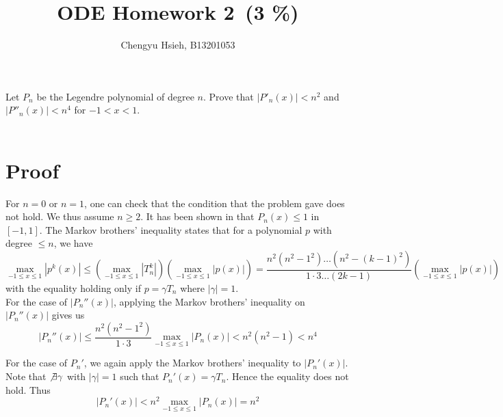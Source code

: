 \documentclass[A4paper,12pt]{article}
\title{ODE Homework 2\, (3 \%)}
\author{Chengyu Hsieh, B13201053}
\date{}
\theoremstyle{definition}
\numberwithin{equation}{section}
\begin{document}
\maketitle


Let \(P_n\) be the Legendre polynomial of degree \(n\). Prove that \(|
P'_n(x)|<n^2\) and \(|P''_n(x)|<n^4\) for \(-1<x<1\).\\
\\
\section*{Proof}
For $n = 0$ or $n = 1$, one can check that the condition that the problem gave does not hold. We thus assume $n \geq 2$.
It has been shown in \cite{szego1975} that $P_{n}(x) \leq 1$ in $[-1, 1]$. The Markov brothers' inequality\cite{shadrin2005} states that for a polynomial $p$ with degree $\leq n$, we have 
$$
\max_{-1 \leq x \leq 1} |p^{k}(x)| \leq (\max_{-1 \leq x \leq 1}|T_{n}^{k}|)(\max_{-1 \leq x \leq 1} |p(x)|) = \frac{n^{2}(n^{2}-1^{2}) \dots (n^{2}-(k-1)^{2})}{1 \cdot 3 \dots (2k-1)}(\max_{-1 \leq x \leq 1} |p(x)|)
$$
with the equality holding only if $p = \gamma T_{n}$ where $|\gamma| = 1$\cite{shadrin2005}.\\

For the case of $|P_{n}''(x)|$, applying the Markov brothers' inequality on $|P_{n}''(x)|$ gives us
$$
|P_{n}''(x)| \leq \frac{n^{2}(n^{2}-1^{2})}{1 \cdot 3} \max_{-1\leq x \leq 1}|P_{n}(x)| < n^{2}(n^{2}-1) < n^{4}
$$

For the case of $P_{n}'$, we again apply the Markov brothers' inequality to $|P_{n}'(x)|$. Note that $\not\exists \gamma$ with $|\gamma|=1 $ such that $P_{n}'(x) = \gamma T_{n}$. Hence the equality does not hold. Thus
$$
|P_{n}'(x)| < n^{2} \max_{-1 \leq x \leq 1}|P_{n}(x)| = n^{2}
$$



\end{document}
